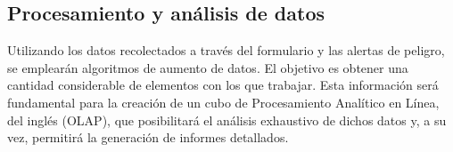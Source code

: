 \subsection{Procesamiento y análisis de datos}
Utilizando los datos recolectados a través del formulario y las alertas de peligro, se
emplearán algoritmos de aumento de datos. El objetivo es obtener una cantidad considerable
de elementos con los que trabajar. Esta información será fundamental para la creación de un
cubo de Procesamiento Analítico en Línea, del inglés (OLAP), que posibilitará el análisis
exhaustivo de dichos datos y, a su vez, permitirá la generación de informes detallados.
